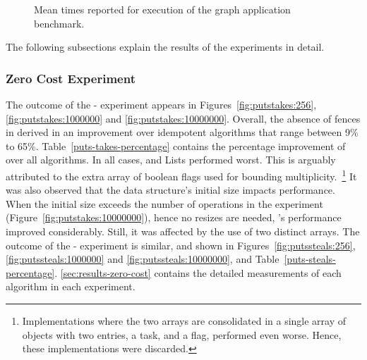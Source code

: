 \begin{figure}[!ht]

  \caption{\label{fig:graphapplication} Mean times reported for execution of the graph application benchmark.}
\end{figure}

The following subsections explain the results of the experiments in detail.

\subsubsection{Zero Cost Experiment}


The outcome of the \Puts{}-\Takes{} experiment appears in Figures~\ref{fig:putstakes:256}, \ref{fig:putstakes:1000000} and \ref{fig:putstakes:10000000}.  Overall, the absence of fences in \NCWSM derived in an improvement over idempotent algorithms that range between 9\% to 65\%.  Table~\ref{puts-takes-percentage} contains the percentage improvement of \NCWSM over all algorithms.  In all cases, \BNCWSM and \BNCWSM Lists performed worst. This is arguably attributed to the extra array of boolean flags used for bounding multiplicity.~\footnote{Implementations where the two arrays are consolidated in a single array of objects with two entries, a task, and a flag, performed even worse. Hence, these implementations were discarded.}  It was also observed that the data structure's initial size impacts performance.  When the initial size exceeds the number of operations in the experiment (Figure~\ref{fig:putstakes:10000000}), hence no resizes are needed, \BNCWSM's performance improved considerably. Still, it was affected by the use of two distinct arrays.  The outcome of the \Puts{}-\Steal{}{} experiment is similar, and shown in Figures~\ref{fig:putssteals:256}, \ref{fig:putssteals:1000000} and \ref{fig:putssteals:10000000}, and Table~\ref{puts-steals-percentage}.  \ref{sec:results-zero-cost} contains the detailed measurements of each algorithm in each experiment.

